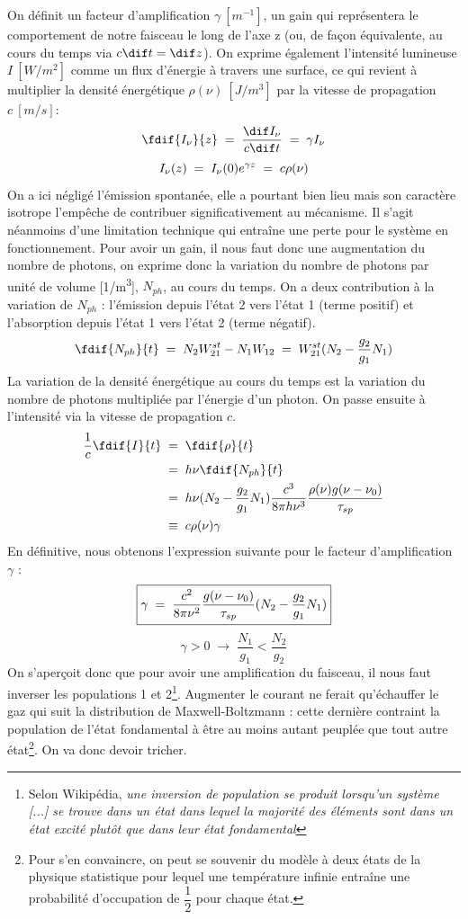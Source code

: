 On définit un facteur d'amplification $\gamma\ [\si{m^{-1}}]$, un gain qui représentera le comportement de notre faisceau le long de l'axe z (ou, de façon équivalente, au cours du temps via $c\dif t = \dif z$). On exprime également l'intensité lumineuse $I\ [\si{W/m^2}]$ comme un flux d'énergie à travers une surface, ce qui revient à multiplier la densité énergétique $\rho(\nu)\ [\si{J/m^3}]$ par la vitesse de propagation $c\ [\si{m/s}]$:
\[
    \fdif{I_\nu}{z} \eq \dfrac{\dif I_\nu}{c\dif t} \eq \gamma I_\nu
\]
\[
    I_\nu(z) \; = \; I_\nu(0) e^{\gamma z} \; = \; c\rho(\nu)
\]
On a ici négligé l'émission spontanée, elle a pourtant bien lieu mais son caractère isotrope l'empêche de contribuer significativement au mécanisme. Il s'agit néanmoins d'une limitation technique qui entraîne une perte pour le système en fonctionnement.
Pour avoir un gain, il nous faut donc une augmentation du nombre de photons, on exprime donc la variation du nombre de photons par unité de volume [\si{1/m^3}], $N_{ph}$, au cours du temps. On a deux contribution à la variation de $N_{ph}$ : l'émission depuis l'état 2 vers l'état 1 (terme positif) et l'absorption depuis l'état 1 vers l'état 2 (terme négatif).
\[
    \fdif{N_{ph}}{t}
    \eq N_2 W_{21}^{st} - N_1 W_{12}
    \eq W_{21}^{st} (N_2 - \dfrac{g_2}{g_1}N_1)
\]
La variation de la densité énergétique au cours du temps est la variation du nombre de photons multipliée par l'énergie d'un photon. On passe ensuite à l'intensité via la vitesse de propagation $c$.
\begin{align*}
    \dfrac{1}{c}\fdif{I}{t}
    &\eq  \fdif{\rho}{t}\\
    &\eq  h\nu\fdif{N_{ph}}{t}\\
    &\eq  h\nu (N_2 - \dfrac{g_2}{g_1}N_1) \dfrac{c^3}{8\pi h \nu^3}\dfrac{\rho(\nu) g(\nu - \nu_0)}{\tau_{sp}}\\
    &\;\equiv\;  c\rho(\nu)\gamma
\end{align*}
En définitive, nous obtenons l'expression suivante pour le facteur d'amplification $\gamma$ :
\begin{equation}
    \boxed{
        \gamma \; = \; \dfrac{c^2}{8\pi\nu^2}\dfrac{g(\nu - \nu_0)}{\tau_{sp}}(N_2 - \dfrac{g_2}{g_1}N_1)
    }
\end{equation}
\[
\boxed{
    \gamma > 0 \; \longrightarrow \; \dfrac{N_1}{g_1} < \dfrac{N_2}{g_2}
    }
\]
On s'aperçoit donc que pour avoir une amplification du faisceau, il nous faut inverser les populations 1 et 2\footnote{Selon Wikipédia, \textit{une inversion de population se produit lorsqu'un système [...] se trouve dans un état dans lequel la majorité des éléments sont dans un état excité plutôt que dans leur état fondamental}}. Augmenter le courant ne ferait qu'échauffer le gaz qui suit la distribution de Maxwell-Boltzmann : cette dernière contraint la population de l'état fondamental à être au moins autant peuplée que tout autre état\footnote{Pour s'en convaincre, on peut se souvenir du modèle à deux états de la physique statistique pour lequel une température infinie entraîne une probabilité d'occupation de $\dfrac{1}{2}$ pour chaque état.}. On va donc devoir tricher.


